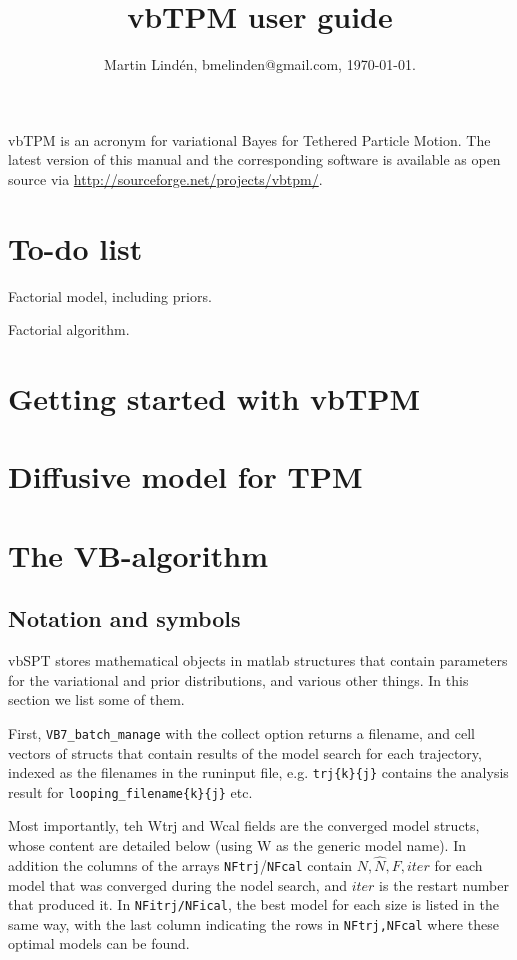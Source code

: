 \documentclass[11pt,letterpaper,twocolumn]{article}
\title{vbTPM user guide}
\author{Martin Lind\'en, bmelinden@gmail.com, \today.}
\date{}
\begin{document}
\maketitle 
vbTPM is an acronym for variational Bayes for Tethered Particle
Motion. The latest version of this manual and the corresponding
software is available as open source via
\url{http://sourceforge.net/projects/vbtpm/}.
\tableofcontents
\section*{To-do list}
Factorial model, including priors.

Factorial algorithm.



\section{Getting started with vbTPM}

\section{Diffusive model for TPM}

\section{The VB-algorithm}

\subsection{Notation and symbols}\label{sec:notation}
vbSPT stores mathematical objects in matlab structures that contain
parameters for the variational and prior distributions, and various
other things. In this section we list some of them.

First, \verb+VB7_batch_manage+ with the collect option returns a
filename, and cell vectors of structs that contain results of the
model search for each trajectory, indexed as the filenames in the
runinput file, e.g. \verb+trj{k}{j}+ contains the analysis result for
\verb+looping_filename{k}{j}+ etc. 

Most importantly, teh Wtrj and Wcal fields are the converged model
structs, whose content are detailed below (using W as the generic
model name). In addition the columns of the arrays
\verb+NFtrj+/\verb+NFcal+ contain $N,\hat N, F, iter$ for each model
that was converged during the nodel search, and $iter$ is the restart
number that produced it. In \verb+NFitrj/NFical+, the best model for
each size is listed in the same way, with the last column indicating
the rows in \verb+NFtrj,NFcal+ where these optimal models can be
found. 
\end{document}
